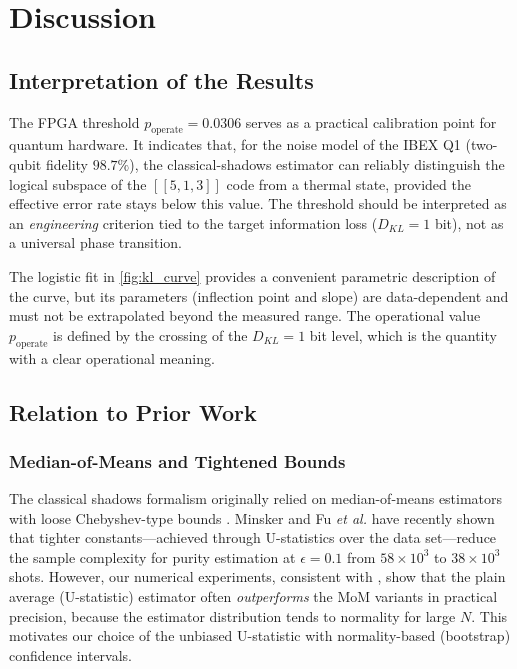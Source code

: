 \documentclass[12pt,a4paper,oneside]{book}
\theoremstyle{plain}
\theoremstyle{definition}
\theoremstyle{remark}
\begin{document}
\chapter{Discussion}
\label{chap:discussion}

\section{Interpretation of the Results}
\label{sec:disc_interpretation}

The FPGA threshold $p_{\text{operate}} = 0.0306$ serves as a practical calibration point for quantum hardware. It indicates that, for the noise model of the IBEX Q1 (two-qubit fidelity $98.7\%$), the classical-shadows estimator can reliably distinguish the logical subspace of the $[[5,1,3]]$ code from a thermal state, provided the effective error rate stays below this value. The threshold should be interpreted as an \emph{engineering} criterion tied to the target information loss ($D_{KL} = 1$ bit), not as a universal phase transition.

The logistic fit in \cref{fig:kl_curve} provides a convenient parametric description of the curve, but its parameters (inflection point and slope) are data-dependent and must not be extrapolated beyond the measured range. The operational value $p_{\text{operate}}$ is defined by the crossing of the $D_{KL} = 1$ bit level, which is the quantity with a clear operational meaning.

\section{Relation to Prior Work}
\label{sec:disc_related}

\subsection{Median-of-Means and Tightened Bounds}

The classical shadows formalism originally relied on median-of-means estimators with loose Chebyshev-type bounds \cite{huang2020predicting}. Minsker \cite{minsker2023efficient} and Fu \textit{et al.} \cite{fu2025classical} have recently shown that tighter constants---achieved through U-statistics over the data set---reduce the sample complexity for purity estimation at $\epsilon = 0.1$ from $58 \times 10^3$ to $38 \times 10^3$ shots. However, our numerical experiments, consistent with \cite{fu2025classical}, show that the plain average (U-statistic) estimator often \emph{outperforms} the MoM variants in practical precision, because the estimator distribution tends to normality for large $N$. This motivates our choice of the unbiased U-statistic with normality-based (bootstrap) confidence intervals.
\end{document}
